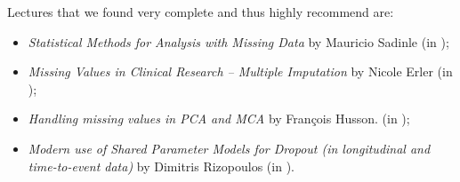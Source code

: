 Lectures that we found very complete and thus highly recommend are:
\begin{itemize}
\item \textit{Statistical Methods for Analysis with Missing Data} by Mauricio
Sadinle (in );
\item \textit{Missing Values in Clinical Research -- Multiple Imputation} by
Nicole Erler (in );
\item \textit{Handling missing values in PCA and MCA} by Fran\c cois Husson. (in
);
\item \textit{Modern use of Shared Parameter Models for Dropout (in longitudinal and time-to-event data)} by Dimitris Rizopoulos (in ).
\end{itemize}

